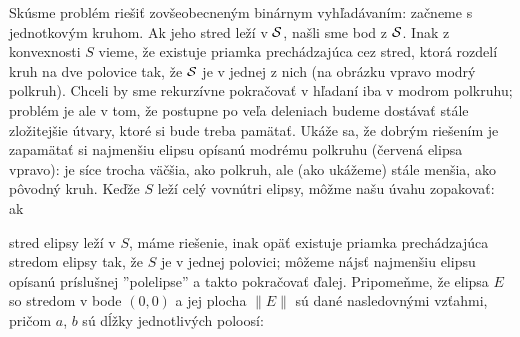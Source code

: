 \noindent
\begin{minipage}[t]{0.5\textwidth}
  \vskip 0pt
  Skúsme problém \member riešiť zovšeobecneným binárnym vyhľadávaním: začneme s jednotkovým kruhom. Ak jeho
  stred leží v $\cal S$, našli sme bod z $\cal S$. Inak z konvexnosti $S$ vieme, že existuje
  priamka prechádzajúca cez stred, ktorá rozdelí kruh na dve polovice tak, že
  $\cal S$ je v jednej z nich (na obrázku vpravo modrý polkruh).  
  Chceli by sme rekurzívne pokračovať v hľadaní iba v modrom
  polkruhu; problém je ale v tom, že postupne po veľa deleniach budeme dostávať
  stále zložitejšie útvary, ktoré si bude treba pamätať.  
  Ukáže sa, že dobrým riešením je zapamätať si najmenšiu elipsu opísanú modrému polkruhu (červená elipsa vpravo):
  je síce trocha väčšia, ako polkruh, ale (ako ukážeme) 
  stále menšia, ako pôvodný kruh. Keďže $S$ leží celý vovnútri elipsy,
  môžme našu úvahu zopakovať: ak 
\end{minipage}
\begin{minipage}[t]{0.5\textwidth}
  \vskip 0pt
\begin{center}
\end{center}
\end{minipage}
\noindent  
  stred elipsy leží v $S$, 
  máme riešenie, inak 
  opäť existuje priamka prechádzajúca stredom elipsy tak, 
  že $S$ je v jednej polovici; môžeme nájsť najmenšiu
  elipsu opísanú príslušnej ''polelipse'' a takto pokračovať ďalej.
Pripomeňme, že elipsa $E$ so stredom v bode $(0,0)$ a jej plocha $\lVert E\rVert$ sú dané nasledovnými vzťahmi,
pričom $a$, $b$ sú dĺžky jednotlivých poloosí:

